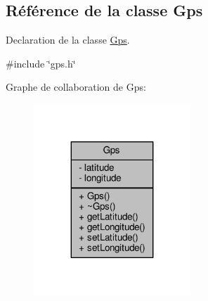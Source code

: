 \hypertarget{class_gps}{}\subsection{Référence de la classe Gps}
\label{class_gps}


Declaration de la classe \hyperlink{class_gps}{Gps}.  




{\ttfamily \#include \char`\"{}gps.\+h\char`\"{}}



Graphe de collaboration de Gps\+:\nopagebreak
\begin{figure}[H]
\begin{center}
\leavevmode
\includegraphics[width=167pt]{class_gps__coll__graph}
\end{center}
\end{figure}

